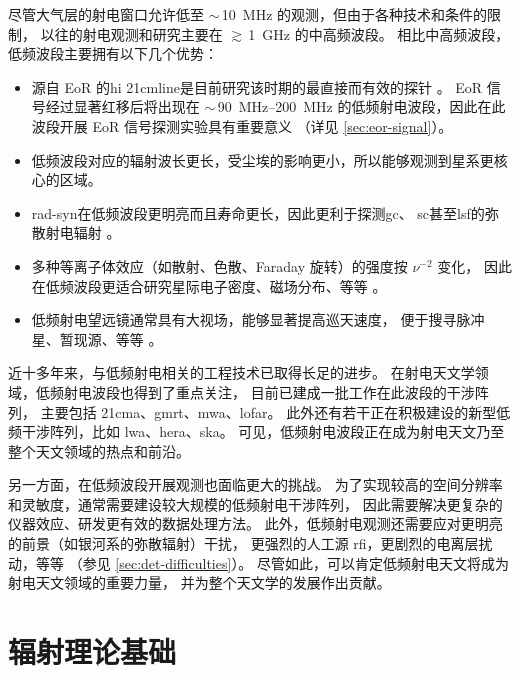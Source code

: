 尽管大气层的射电窗口允许低至 $\sim$\,\SI{10}{\MHz} 的观测，但由于各种技术和条件的限制，
以往的射电观测和研究主要在 $\gtrsim$\,\SI{1}{\GHz} 的中高频波段。
相比中高频波段，低频波段主要拥有以下几个优势：
\begin{itemize}
  \item 源自 EoR 的\ac{hi} \ac{21cmline}是目前研究该时期的最直接而有效的探针
    \cite{morales2010}。
    EoR 信号经过显著红移后将出现在 $\sim$\,\SIrange{90}{200}{\MHz}
    的低频射电波段，因此在此波段开展 EoR 信号探测实验具有重要意义
    \cite{mellema2013,mellema2015,koopmans2015}
    （详见 \autoref{sec:eor-signal}）。
  \item 低频波段对应的辐射波长更长，受尘埃的影响更小，所以能够观测到星系更核心的区域。
  \item \ac{rad-syn}在低频波段更明亮而且寿命更长，因此更利于探测\ac{gc}、
    \ac{sc}甚至\ac{lsf}的弥散射电辐射 \cite{cassano2015,vazza2015,kale2016}。
  \item 多种等离子体效应（如散射、色散、Faraday 旋转）的强度按 $\nu^{-2}$ 变化，
    因此在低频波段更适合研究星际电子密度、磁场分布、等等
    \cite{johnston2015,roy2016,vanEck2017}。
  \item 低频射电望远镜通常具有大视场，能够显著提高巡天速度，
    便于搜寻脉冲星、暂现源、等等 \cite{stappers2011,fender2015}。
\end{itemize}

近十多年来，与低频射电相关的工程技术已取得长足的进步。
在射电天文学领域，低频射电波段也得到了重点关注，
目前已建成一批工作在此波段的干涉阵列，
主要包括 \ac{21cma}、\ac{gmrt}、\ac{mwa}、\ac{lofar}。
此外还有若干正在积极建设的新型低频干涉阵列，比如 \ac{lwa}、\ac{hera}、\ac{ska}。
可见，低频射电波段正在成为射电天文乃至整个天文领域的热点和前沿。

另一方面，在低频波段开展观测也面临更大的挑战。
为了实现较高的空间分辨率和灵敏度，通常需要建设较大规模的低频射电干涉阵列，
因此需要解决更复杂的仪器效应、研发更有效的数据处理方法。
此外，低频射电观测还需要应对更明亮的前景（如银河系的弥散辐射）干扰，
更强烈的人工源 \ac{rfi}，更剧烈的电离层扰动，等等
（参见 \autoref{sec:det-difficulties}）。
尽管如此，可以肯定低频射电天文将成为射电天文领域的重要力量，
并为整个天文学的发展作出贡献。


\section{辐射理论基础}
\label{sec:radiation}

